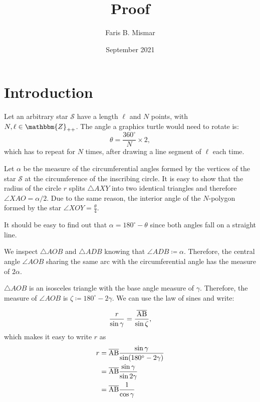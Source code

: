 \documentclass{article}
\title{Proof}
\author{Faris B. Mismar}
\date{September 2021}
\begin{document}
\maketitle

\section{Introduction}

Let an arbitrary star $\mathcal{S}$ have a length $\ell$ and $N$ points, with $N, \ell \in \mathbbm{Z}_{++}$.  The angle a graphics turtle would need to rotate is:
\begin{equation}
    \theta = \frac{360^\circ}{N} \times 2,
\end{equation}%
which has to repeat for $N$ times, after drawing a line segment of $\ell$ each time.

Let $\alpha$ be the measure of the circumferential angles formed by the vertices of the star $\mathcal{S}$ at the circumference of the inscribing circle.  It is easy to show that the radius of the circle $r$ splits $\triangle AXY$ into two identical triangles and therefore $\angle XAO = \alpha/2$.  Due to the same reason, the interior angle of the $N$-polygon formed by the star $\angle XOY = \frac{\theta}{4}$.

It should be easy to find out that $\alpha = 180^\circ - \theta$ since both angles fall on a straight line.

We inspect $\triangle AOB$ and $\triangle ADB$ knowing that $\angle ADB \coloneqq \alpha$.  Therefore, the central angle $\angle AOB$ sharing the same arc with the circumferential angle has the measure of $2\alpha$.

$\triangle AOB$ is an isosceles triangle with the base angle measure of $\gamma$.  Therefore, the measure of $\angle AOB$ is $\zeta \coloneqq 180^\circ - 2 \gamma$.  We can use the law of sines and write:

\begin{equation}
    \frac{r}{\sin \gamma}  = \frac{\overline{\rm AB}}{\sin \zeta},
\end{equation}
which makes it easy to write $r$ as
\begin{equation}
\begin{aligned}
r &= \overline{\rm AB} \frac{\sin \gamma}{\sin (180^\circ - 2\gamma)} \\
  &= \overline{\rm AB} \frac{\sin \gamma}{\sin 2\gamma} \\ 
  &= \overline{\rm AB} \frac{1}{\cos \gamma} \\ 
\end{aligned}
\end{equation}
\end{document}
